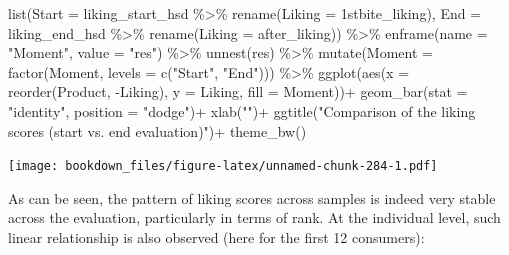 \documentclass[
]{krantz}
\makeatletter
\newenvironment{Shaded}{\begin{snugshade}}{\end{snugshade}}
\newcommand{\AttributeTok}[1]{\textcolor[rgb]{0.61,0.61,0.61}{#1}}
\newcommand{\FunctionTok}[1]{\textcolor[rgb]{0,0,0}{#1}}
\newcommand{\NormalTok}[1]{#1}
\newcommand{\SpecialCharTok}[1]{\textcolor[rgb]{0,0,0}{#1}}
\newcommand{\StringTok}[1]{\textcolor[rgb]{0.5,0.5,0.5}{#1}}
\newenvironment{kframe}{%
\medskip{}
\setlength{\fboxsep}{.8em}
 \def\at@end@of@kframe{}%
 \ifinner\ifhmode%
  \def\at@end@of@kframe{\end{minipage}}%
  \begin{minipage}{\columnwidth}%
 \fi\fi%
 \def\FrameCommand##1{\hskip\@totalleftmargin \hskip-\fboxsep
 \colorbox{shadecolor}{##1}\hskip-\fboxsep
     \hskip-\linewidth \hskip-\@totalleftmargin \hskip\columnwidth}%
 \MakeFramed {\advance\hsize-\width
   \@totalleftmargin\z@ \linewidth\hsize
   \@setminipage}}%
 {\par\unskip\endMakeFramed%
 \at@end@of@kframe}
\renewenvironment{Shaded}{\begin{kframe}}{\end{kframe}}
\makeatother
\begin{document}
\begin{Shaded}
\begin{Highlighting}[]
\FunctionTok{list}\NormalTok{(}\AttributeTok{Start =}\NormalTok{ liking\_start\_hsd }\SpecialCharTok{\%\textgreater{}\%} \FunctionTok{rename}\NormalTok{(}\AttributeTok{Liking =} \StringTok{\textasciigrave{}}\AttributeTok{1stbite\_liking}\StringTok{\textasciigrave{}}\NormalTok{),}
     \AttributeTok{End =}\NormalTok{ liking\_end\_hsd }\SpecialCharTok{\%\textgreater{}\%} \FunctionTok{rename}\NormalTok{(}\AttributeTok{Liking =} \StringTok{\textasciigrave{}}\AttributeTok{after\_liking}\StringTok{\textasciigrave{}}\NormalTok{)) }\SpecialCharTok{\%\textgreater{}\%}
  \FunctionTok{enframe}\NormalTok{(}\AttributeTok{name =} \StringTok{"Moment"}\NormalTok{, }\AttributeTok{value =} \StringTok{"res"}\NormalTok{) }\SpecialCharTok{\%\textgreater{}\%}
  \FunctionTok{unnest}\NormalTok{(res) }\SpecialCharTok{\%\textgreater{}\%}
  \FunctionTok{mutate}\NormalTok{(}\AttributeTok{Moment =} \FunctionTok{factor}\NormalTok{(Moment, }\AttributeTok{levels =} \FunctionTok{c}\NormalTok{(}\StringTok{"Start"}\NormalTok{, }\StringTok{"End"}\NormalTok{))) }\SpecialCharTok{\%\textgreater{}\%}
  \FunctionTok{ggplot}\NormalTok{(}\FunctionTok{aes}\NormalTok{(}\AttributeTok{x =} \FunctionTok{reorder}\NormalTok{(Product, }\SpecialCharTok{{-}}\NormalTok{Liking), }\AttributeTok{y =}\NormalTok{ Liking, }\AttributeTok{fill =}\NormalTok{ Moment))}\SpecialCharTok{+}
  \FunctionTok{geom\_bar}\NormalTok{(}\AttributeTok{stat =} \StringTok{"identity"}\NormalTok{, }\AttributeTok{position =} \StringTok{"dodge"}\NormalTok{)}\SpecialCharTok{+}
  \FunctionTok{xlab}\NormalTok{(}\StringTok{""}\NormalTok{)}\SpecialCharTok{+}
  \FunctionTok{ggtitle}\NormalTok{(}\StringTok{"Comparison of the liking scores (start vs. end evaluation)"}\NormalTok{)}\SpecialCharTok{+}
  \FunctionTok{theme\_bw}\NormalTok{()}
\end{Highlighting}
\end{Shaded}

\texttt{[image: bookdown\_files/figure-latex/unnamed-chunk-284-1.pdf]}

As can be seen, the pattern of liking scores across samples is indeed very stable across the evaluation, particularly in terms of rank. At the individual level, such linear relationship is also observed (here for the first 12 consumers):
\end{document}
